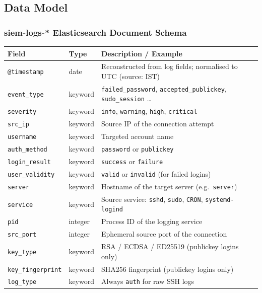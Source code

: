 \documentclass[12pt,a4paper]{article}
\newcommand{\field}[1]{\texttt{#1}}
\begin{document}
\subsection{Data Model}

\subsubsection*{siem-logs-* Elasticsearch Document Schema}

\begin{center}
\begin{tabular}{p{3.5cm}p{1.8cm}p{7.8cm}}
  \toprule
  \textbf{Field} & \textbf{Type} & \textbf{Description / Example} \\
  \midrule
  \field{@timestamp}      & date    & Reconstructed from log fields; normalised to UTC (source: IST) \\
  \field{event\_type}     & keyword & \texttt{failed\_password}, \texttt{accepted\_publickey}, \texttt{sudo\_session} \ldots \\
  \field{severity}        & keyword & \texttt{info}, \texttt{warning}, \texttt{high}, \texttt{critical} \\
  \field{src\_ip}         & keyword & Source IP of the connection attempt \\
  \field{username}        & keyword & Targeted account name \\
  \field{auth\_method}    & keyword & \texttt{password} or \texttt{publickey} \\
  \field{login\_result}   & keyword & \texttt{success} or \texttt{failure} \\
  \field{user\_validity}  & keyword & \texttt{valid} or \texttt{invalid} (for failed logins) \\
  \field{server}          & keyword & Hostname of the target server (e.g.\ \texttt{server}) \\
  \field{service}         & keyword & Source service: \texttt{sshd}, \texttt{sudo}, \texttt{CRON}, \texttt{systemd-logind} \\
  \field{pid}             & integer & Process ID of the logging service \\
  \field{src\_port}       & integer & Ephemeral source port of the connection \\
  \field{key\_type}       & keyword & RSA / ECDSA / ED25519 (publickey logins only) \\
  \field{key\_fingerprint}& keyword & SHA256 fingerprint (publickey logins only) \\
  \field{log\_type}       & keyword & Always \texttt{auth} for raw SSH logs \\
  \bottomrule
\end{tabular}
\end{center}
\end{document}

